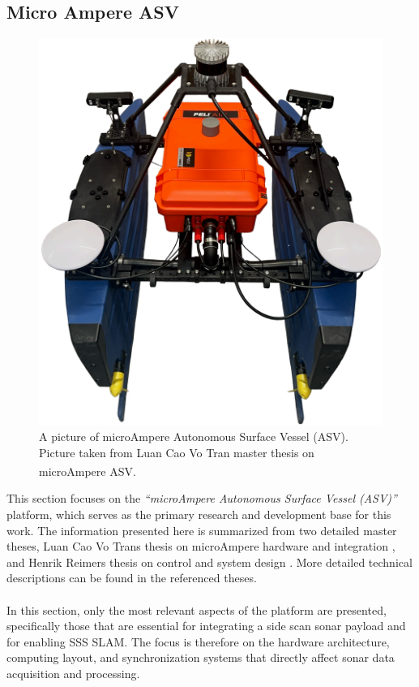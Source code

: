 \subsection{Micro Ampere ASV}
\begin{figure}[!tbp]
    \centering
    \includegraphics[width=0.6\linewidth]{Pictures/Hardware/microAmpere_ASV/microAmpere_ASV.png}
    \caption{A picture of microAmpere Autonomous Surface Vessel (ASV). Picture taken from Luan Cao Vo Tran master thesis on microAmpere ASV.\textsuperscript{\cite{microAmpere_hardware_master_thesis1}}}
    \label{fig:microAmpere}
\end{figure}
\noindent
This section focuses on the \textit{``microAmpere Autonomous Surface Vessel (ASV)''} platform, which serves as the primary research and development base for this work. The information presented here is summarized from two detailed master theses, Luan Cao Vo Trans thesis on microAmpere hardware and integration \cite{microAmpere_hardware_master_thesis1}, and Henrik Reimers thesis on control and system design \cite{microAmpere_hardware_master_thesis2}. More detailed technical descriptions can be found in the referenced theses.
\\ \\
In this section, only the most relevant aspects of the platform are presented, specifically those that are essential for integrating a side scan sonar payload and for enabling SSS SLAM. The focus is therefore on the hardware architecture, computing layout, and synchronization systems that directly affect sonar data acquisition and processing.
